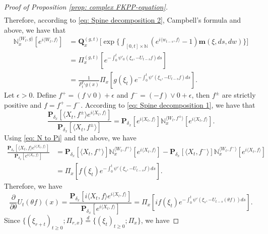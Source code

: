 \documentclass[12pt,a4paper]{amsart}
\theoremstyle{plain}
\theoremstyle{definition}
\numberwithin{equation}{section}
\begin{document}
\begin{proof}[Proof of Proposition \ref{prop: complex FKPP-equation}]
\begin{align}
\end{align}
    Therefore, according to \eqref{eq: Spine decomposition 2}, Campbell's formula and above, we have that
\begin{align}
\label{eq: N to Pi}
    \mathbb N_x^{\langle W_{t}, g\rangle}[e^{i \langle W_t, f\rangle}]
    &=\mathbf Q_x^{(g,t)} \Big[\exp\Big\{\int_{[0,t]\times \mathbb N}(e^{i \langle w_{t-s}, f\rangle} - 1) \mathbf m(\xi, ds,dw)\Big\}\Big]
    \\&= \Pi_x^{(g,t)} [e^{-\int_0^t \psi'_0(\xi_s, -U_{t-s}f)ds}]
    \\&= \frac{1}{P_t^{\rho_1} g (x)} \Pi_x[ g(\xi_t) e^{-\int_0^t \psi'(\xi_s, -U_{t-s}f)ds} ].
\end{align}
    Let $\epsilon >0$.
    Define $f^+ = (f \vee 0) + \epsilon$ and $f^- = (-f) \vee 0 + \epsilon$, then $f^\pm$ are strictly positive and $f = f^+ - f^-$.
    According to \eqref{eq: Spine decomposition 1}, we have that
\begin{equation}
    \frac{\mathbf P_{\delta_x}[\langle X_t,f^{\pm}\rangle e^{i \langle X_t,f\rangle}]}{\mathbf P_{\delta_x}[\langle X_t,f^{\pm}\rangle ]}
    = \mathbf P_{\delta_x}[e^{i \langle X_t,f\rangle}] \mathbb N_x^{\langle W_t,f^{\pm}\rangle}[e^{i \langle X_t,f\rangle}].
\end{equation}
    Using \eqref{eq: N to Pi} and the above, we have
\begin{align}
    \frac{\mathbf P_{\delta_x}[\langle X_t, f\rangle e^{i \langle X_t, f\rangle}] }{\mathbf P_{\delta_x}[e^{i \langle X_t, f\rangle}]}
    &= \mathbf P_{\delta_x}[\langle X_t, f^+\rangle] \mathbb N_x^{\langle W_t, f^+\rangle} [e^{i \langle X_t, f\rangle}] - \mathbf P_{\delta_x}[\langle X_t, f^-\rangle]\mathbb N_x^{\langle W_t, f^-\rangle}[e^{i \langle X_t, f\rangle}]
    \\& = \Pi_x[ f(\xi_t) e^{- \int_0^t \psi'(\xi_s, -U_{t-s}f) ds}  ].
\end{align}
    Therefore, we have
\begin{equation}
    \frac{\partial}{\partial \theta} {U_t(\theta f)(x)}
    = \frac{\mathbf P_{\delta_x}[i\langle X_t, f\rangle e^{i \langle X_t, f\rangle}] }{\mathbf P_{\delta_x}[e^{i \langle X_t, f\rangle}]}
    =  \Pi_x[ if(\xi_t) e^{ - \int_0^t \psi'(\xi_s, -U_{t-s}(\theta f)) ds} ].
\end{equation}
    Since $\{(\xi_{r+t})_{t \geq 0}; \Pi_{r,x}\} \overset{d}{=} \{(\xi_{t})_{t\geq 0}; \Pi_{x}\} $, we have


\end{proof}
\end{document}
